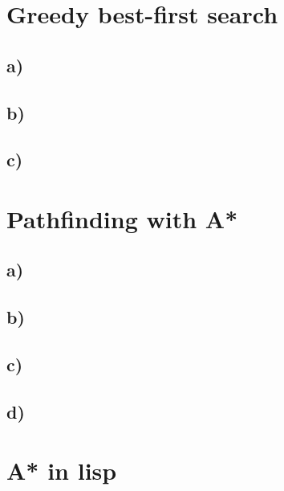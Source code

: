 \documentclass[12pt,a4paper]{scrartcl}
\begin{document}
	
\section{Greedy best-first search}
\subsection*{a)}
\subsection*{b)}
\subsection*{c)}
\section{Pathfinding with A*}
\subsection*{a)}
\subsection*{b)}
\subsection*{c)}
\subsection*{d)}
\section{A* in lisp}
	
\end{document}
